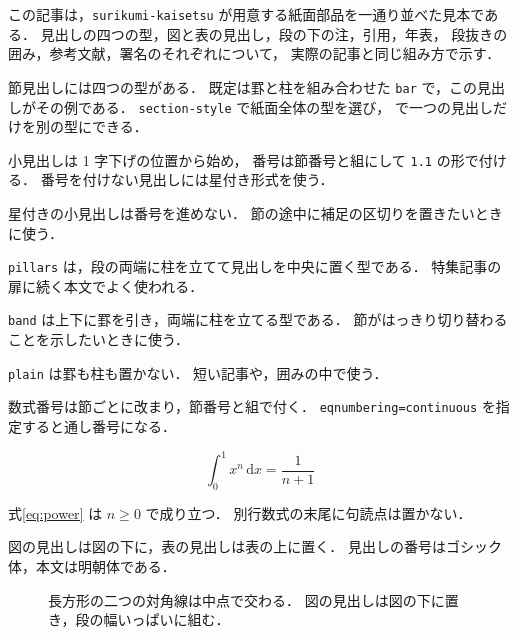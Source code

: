 \documentclass[lualatex,paper=b5j,fontsize=10pt,twoside]{jlreq}
\begin{document}
\MKMakeTitle
\MKArticleReset

この記事は，\texttt{surikumi-kaisetsu} が用意する紙面部品を一通り並べた見本である．
見出しの四つの型，図と表の見出し，段の下の注，引用，年表，
段抜きの囲み，参考文献，署名のそれぞれについて，
実際の記事と同じ組み方で示す．


節見出しには四つの型がある．
既定は罫と柱を組み合わせた \texttt{bar} で，この見出しがその例である．
\texttt{section-style} で紙面全体の型を選び，
\texttt{\string\MKSection[...]} で一つの見出しだけを別の型にできる．


小見出しは 1 字下げの位置から始め，
番号は節番号と組にして \texttt{1.1} の形で付ける．
番号を付けない見出しには星付き形式を使う．


星付きの小見出しは番号を進めない．
節の途中に補足の区切りを置きたいときに使う．


\texttt{pillars} は，段の両端に柱を立てて見出しを中央に置く型である．
特集記事の扉に続く本文でよく使われる．


\texttt{band} は上下に罫を引き，両端に柱を立てる型である．
節がはっきり切り替わることを示したいときに使う．


\texttt{plain} は罫も柱も置かない．
短い記事や，囲みの中で使う．


数式番号は節ごとに改まり，節番号と組で付く．
\texttt{eqnumbering=continuous} を指定すると通し番号になる．

\begin{equation}
  \int_0^1 x^n\,\mathrm{d}x=\dfrac{1}{n+1}
  \label{eq:power}
\end{equation}

式\eqref{eq:power} は $n\geq0$ で成り立つ．
別行数式の末尾に句読点は置かない．


図の見出しは図の下に，表の見出しは表の上に置く．
見出しの番号はゴシック体，本文は明朝体である．

\begin{figure}[t]
  \begin{mkfigurebody}
  \end{mkfigurebody}
  \caption{長方形の二つの対角線は中点で交わる．
    図の見出しは図の下に置き，段の幅いっぱいに組む．}
  \label{fig:diagonal}
\end{figure}
\end{document}
